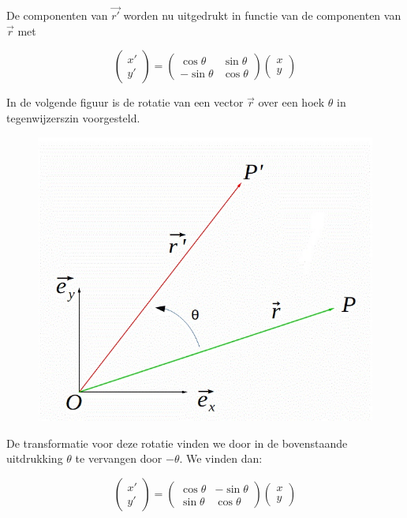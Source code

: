 De componenten van $\vec{r'}$ worden nu uitgedrukt in functie van de componenten van $\vec{r}$ met

\[
\left( \begin{array}{l} x' \\ y' \end{array} \right)= \left( \begin{array}{rr} \cos \theta & \sin \theta \\ -\sin \theta & \cos \theta \end{array} \right) \left( \begin{array}{l} x \\ y \end{array} \right) 
\]

In de volgende figuur is de rotatie van een vector $\vec{r}$ over een hoek $\theta$ in tegenwijzerszin voorgesteld.

\begin{figure}[h]
	\begin{center}
		\includegraphics[scale=0.5]{5_vglen_ongelijkheden_stelsels_matrices/inputs/matrices-fig-3}
	\end{center}
\end{figure}

De transformatie voor deze rotatie vinden we door in de bovenstaande uitdrukking $\theta$ te vervangen door $-\theta$. We vinden dan:

\[
\left( \begin{array}{l} x' \\ y' \end{array} \right)= \left( \begin{array}{rr} \cos \theta & -\sin \theta \\ \sin \theta & \cos \theta \end{array} \right) \left( \begin{array}{l} x \\ y \end{array} \right) 
\]

